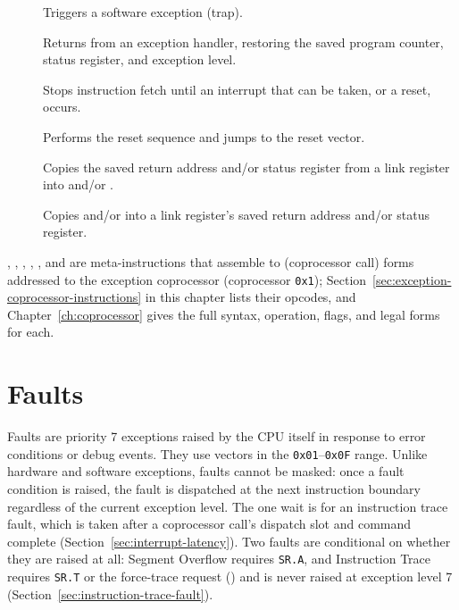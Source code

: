 \begin{description}
	\item[] Triggers a software exception (trap).
	\item[] Returns from an exception handler, restoring the saved program counter, status register, and
	      exception level.
	\item[] Stops instruction fetch until an interrupt that can be taken, or a reset, occurs.
	\item[] Performs the reset sequence and jumps to the reset vector.
	\item[] Copies the saved return address and/or status register from a link register into 
	      and/or .
	\item[] Copies  and/or  into a link register's saved return address and/or status
	      register.
\end{description}

, , , , , and  are
meta-instructions that assemble to  (coprocessor call) forms addressed to the exception coprocessor
(coprocessor \texttt{0x1}); Section~\ref{sec:exception-coprocessor-instructions} in this chapter lists
their opcodes, and Chapter~\ref{ch:coprocessor} gives the full syntax, operation, flags, and legal forms for each.

\section{Faults}

Faults are priority 7 exceptions raised by the CPU itself in response to error conditions or debug events. They use
vectors in the \texttt{0x01}--\texttt{0x0F} range. Unlike hardware and software exceptions, faults cannot be masked:
once a fault condition is raised, the fault is dispatched at the next instruction boundary regardless of the current
exception level. The one wait is for an instruction trace fault, which is taken after a coprocessor call's dispatch
slot and command complete (Section~\ref{sec:interrupt-latency}). Two faults are conditional on whether they are raised
at all: Segment Overflow requires \texttt{SR.A}, and Instruction Trace requires \texttt{SR.T} or the force-trace
request () and is never raised at exception level 7 (Section~\ref{sec:instruction-trace-fault}).

